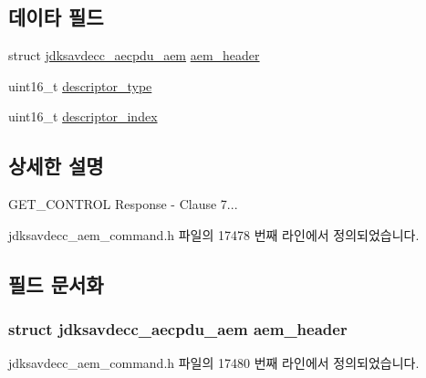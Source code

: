 \subsection*{데이타 필드}
\begin{DoxyCompactItemize}
\item 
struct \hyperlink{structjdksavdecc__aecpdu__aem}{jdksavdecc\+\_\+aecpdu\+\_\+aem} \hyperlink{structjdksavdecc__aem__command__get__control__response_ae1e77ccb75ff5021ad923221eab38294}{aem\+\_\+header}
\item 
uint16\+\_\+t \hyperlink{structjdksavdecc__aem__command__get__control__response_ab7c32b6c7131c13d4ea3b7ee2f09b78d}{descriptor\+\_\+type}
\item 
uint16\+\_\+t \hyperlink{structjdksavdecc__aem__command__get__control__response_a042bbc76d835b82d27c1932431ee38d4}{descriptor\+\_\+index}
\end{DoxyCompactItemize}


\subsection{상세한 설명}
G\+E\+T\+\_\+\+C\+O\+N\+T\+R\+OL Response -\/ Clause 7... 

jdksavdecc\+\_\+aem\+\_\+command.\+h 파일의 17478 번째 라인에서 정의되었습니다.



\subsection{필드 문서화}
\subsubsection[{\texorpdfstring{aem\+\_\+header}{aem_header}}]{\setlength{\rightskip}{0pt plus 5cm}struct {\bf jdksavdecc\+\_\+aecpdu\+\_\+aem} aem\+\_\+header}\hypertarget{structjdksavdecc__aem__command__get__control__response_ae1e77ccb75ff5021ad923221eab38294}{}\label{structjdksavdecc__aem__command__get__control__response_ae1e77ccb75ff5021ad923221eab38294}


jdksavdecc\+\_\+aem\+\_\+command.\+h 파일의 17480 번째 라인에서 정의되었습니다.


